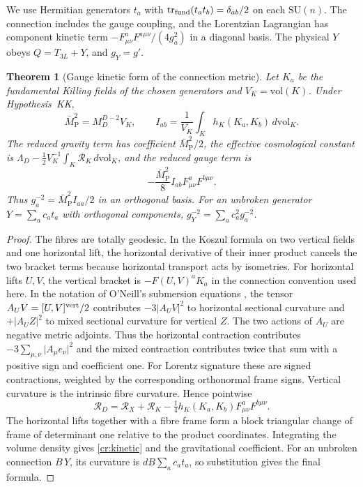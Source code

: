 \documentclass[aps,pra,onecolumn,superscriptaddress,nofootinbib,10pt]{revtex4-2}
\newtheorem{theorem}{Theorem}
\theoremstyle{definition}
\theoremstyle{remark}
\newcommand{\SU}{\mathrm{SU}}
\begin{document}
We use Hermitian generators $t_a$ with
$\operatorname{tr}_{\rm fund}(t_at_b)=\delta_{ab}/2$ on each
$\SU(n)$. The connection includes the gauge coupling, and
the Lorentzian Lagrangian has component kinetic term
$-F^a_{\mu\nu}F^{a\mu\nu}/(4g_a^2)$ in a diagonal basis.
The physical $Y$ obeys $Q=T_{3L}+Y$, and $g_Y=g'$.

\begin{theorem}[Gauge kinetic form of the connection metric]\label{cr:eh}
Let $K_a$ be the fundamental Killing fields of the chosen generators
and $V_K=\mathrm{vol}(K)$. Under Hypothesis~KK,
\[
 \bar M_{\mathrm P}^2=M_D^{D-2}V_K,\qquad
 I_{ab}=\frac{1}{V_K}\int_K h_K(K_a,K_b)\,d\mathrm{vol}_K.
\]
The reduced gravity term has coefficient $\bar M_{\mathrm P}^2/2$,
the effective cosmological constant is
$\Lambda_D-\tfrac12 V_K^{-1}\int_K\mathcal R_K\,d\mathrm{vol}_K$,
and the reduced gauge term is
\begin{equation}\label{cr:kinetic}
 -\frac{\bar M_{\mathrm P}^2}{8} I_{ab}F^a_{\mu\nu}F^{b\mu\nu}.
\end{equation}
Thus $g_a^{-2}=\bar M_{\mathrm P}^2 I_{aa}/2$ in an orthogonal basis.
For an unbroken generator $Y=\sum_a c_a t_a$ with orthogonal
components, $g_Y^{-2}=\sum_a c_a^2g_a^{-2}$.
\end{theorem}
\begin{proof}
The fibres are totally geodesic. In the Koszul formula on two vertical
fields and one horizontal lift, the horizontal derivative of their
inner product cancels the two bracket terms because horizontal
transport acts by isometries. For horizontal lifts $U,V$, the vertical
bracket is $-F(U,V)^aK_a$ in the connection convention used here. In the
notation of O'Neill's submersion equations
\cite{cr:oneill,ONeill}, the tensor $A_UV=[U,V]^{\rm vert}/2$ contributes
$-3\lvert A_UV\rvert^2$ to horizontal sectional curvature and
$+\lvert A_U Z\rvert^2$ to mixed sectional curvature for vertical $Z$.
The two actions of $A_U$ are negative metric adjoints. Thus the
horizontal contraction contributes $-3\sum_{\mu,\nu}\lvert
A_\mu e_\nu\rvert^2$ and the mixed contraction contributes twice that
sum with a positive sign and coefficient one. For Lorentz signature
these are signed contractions, weighted by the corresponding
orthonormal frame signs. Vertical curvature is the intrinsic fibre
curvature. Hence pointwise
\[
 \mathcal R_D=\mathcal R_X+\mathcal R_K
       -\tfrac14 h_K(K_a,K_b)F^a_{\mu\nu}F^{b\mu\nu}.
\]
The horizontal lifts together with a fibre frame form a block
triangular change of frame of determinant one relative to the
product coordinates. Integrating the volume density gives
\eqref{cr:kinetic} and the gravitational coefficient.
For an unbroken connection $B\,Y$, its curvature is
$dB\sum_a c_at_a$, so substitution gives the final formula.
\end{proof}
\end{document}
